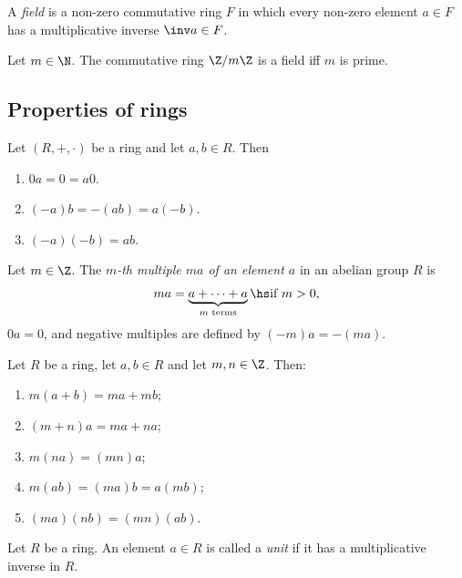 \documentclass{article}
\begin{document}
\begin{definition}
	A \emph{field} is a non-zero commutative ring $F$ in which every non-zero element
	$a\in F$ has a multiplicative inverse $\inv a\in F$.
\end{definition}

\begin{proposition}[Notes 3.1.11]
	Let $m\in\N$. The commutative ring $\Z/m\Z$ is a field iff $m$ is prime.
\end{proposition}

\subsection{Properties of rings}

\begin{lemma}[Notes 3.2.1]
	Let $(R,+,\cdot)$ be a ring and let $a,b\in R$. Then
	\begin{enumerate}
		\item $0a=0=a0$.
		\item $(-a)b=-(ab)=a(-b)$.
		\item $(-a)(-b) = ab$.
	\end{enumerate}
\end{lemma}

\begin{definition}
	Let $m\in\Z$. The \emph{$m$-th multiple $ma$ of an element $a$} in an abelian
	group $R$ is
	\begin{align*}
		ma = \underbrace{a + \cdots + a}_\text{$m$ terms} \hs \text{if } m >0,
	\end{align*}
	$0a=0$, and negative multiples are defined by $(-m)a=-(ma)$.
\end{definition}

\begin{lemma}[Notes 3.2.4]
	Let $R$ be a ring, let $a,b\in R$ and let $m,n\in\Z$. Then:
	\begin{enumerate}
		\item $m(a+b)=ma+mb$;
		\item $(m+n)a=ma+na$;
		\item $m(na)=(mn)a$;
		\item $m(ab)=(ma)b=a(mb)$;
		\item $(ma)(nb)=(mn)(ab)$.
	\end{enumerate}
\end{lemma}

\begin{definition}
	Let $R$ be a ring. An element $a\in R$ is called a \emph{unit} if it has a
	multiplicative inverse in $R$.
\end{definition}
\end{document}
